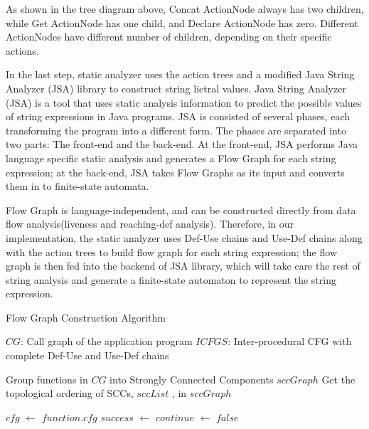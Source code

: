 As shown in the tree diagram above, Concat ActionNode always has two children, while Get ActionNode has one child, and Declare ActionNode has zero. Different ActionNodes have different number of children, depending on their specific actions.

In the last step, static analyzer uses the action trees and a modified Java String Analyzer (JSA) library to construct string lietral values. Java String Analyzer (JSA) \cite{ref3} is a tool that uses static analysis information to predict the possible values of string expressions in Java programs. JSA is consisted of several phases, each transforming the program into a different form. The phases are separated into two parts: The front-end and the back-end. At the front-end, JSA performs Java language specific static analysis and generates a Flow Graph for each string expression; at the back-end, JSA takes Flow Graphs as its input and converts them in to finite-state automata.

Flow Graph is language-independent, and can be constructed directly from data flow analysis(liveness and reaching-def analysis). Therefore, in our implementation, the static analyzer uses Def-Use chains and Use-Def chains along with the action trees to build flow graph for each string expression; the flow graph is then fed into the backend of JSA library, which will take care the rest of string analysis and generate a finite-state automaton to represent the string expression.

\begin{algorithm}
\caption{Flow Graph Construction Algorithm}
\begin{algorithmic}[1]
\Require 
  \State $CG$: Call graph of the application program
  \State $ICFGS$: Inter-procedural CFG with complete Def-Use and Use-Def chains

\State Group functions in $CG$ into Strongly Connected Components $sccGraph$
\State Get the topological ordering of SCCs, $sccList$ , in $sccGraph$

      \State $cfg$ $\gets$ $function.cfg$
        \State $success$ $\gets$ 
          \State $continue$ $\gets$ $false$
        \EndIf
      \EndFor
    \EndFor
  \EndFor
\EndUntil

\EndProcedure

\end{algorithmic}
\end{algorithm}


